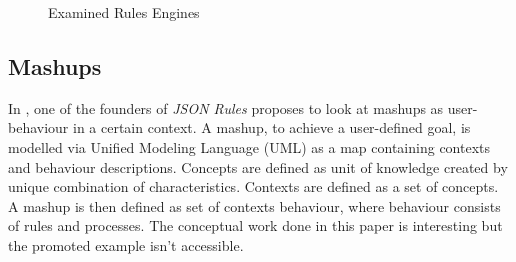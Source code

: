 \documentclass[11pt]{article}%
\begin{document}
\begin{figure}[htb]
\centering

\caption{Examined Rules Engines}
\end{figure}

\subsection{Mashups}
In \cite{2011-Pascalau-MBC.pdf}, one of the founders of \emph{JSON Rules} proposes to look at mashups as user-behaviour in a certain context. A mashup, to achieve a user-defined goal, is modelled via Unified Modeling Language (UML) as a map containing contexts and behaviour descriptions. Concepts are defined as unit of knowledge created by unique combination of characteristics. Contexts are defined as a set of concepts. A mashup is then defined as  set of contexts behaviour, where behaviour consists of rules and processes. The conceptual work done in this paper is interesting but the promoted example isn't accessible.
\end{document}
